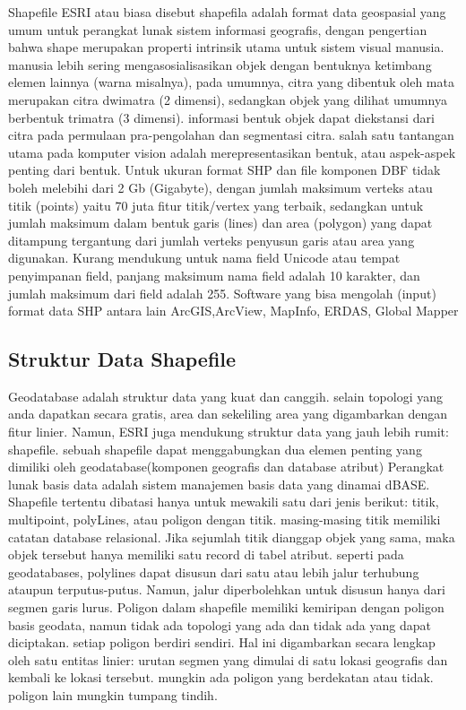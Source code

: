 Shapefile ESRI atau biasa disebut shapefila adalah format data geospasial yang umum untuk perangkat lunak sistem informasi geografis, dengan pengertian bahwa shape merupakan properti intrinsik utama untuk sistem visual manusia. manusia lebih sering mengasosialisasikan objek dengan bentuknya ketimbang elemen lainnya (warna misalnya), pada umumnya, citra yang dibentuk oleh mata merupakan citra dwimatra (2 dimensi), sedangkan objek yang dilihat umumnya berbentuk trimatra (3 dimensi). informasi bentuk objek dapat diekstansi dari citra pada permulaan pra-pengolahan dan segmentasi citra. salah satu tantangan utama pada komputer vision adalah merepresentasikan bentuk, atau aspek-aspek penting dari bentuk.
Untuk ukuran format SHP dan file komponen DBF tidak boleh melebihi dari 2 Gb (Gigabyte), 
dengan jumlah maksimum verteks atau titik (points) yaitu 70 juta fitur titik/vertex yang terbaik, 
sedangkan untuk jumlah maksimum dalam bentuk garis (lines) dan area (polygon) yang dapat ditampung tergantung dari jumlah verteks penyusun garis atau area yang digunakan. 
Kurang mendukung untuk nama field Unicode atau tempat penyimpanan field, panjang maksimum nama field adalah 10 karakter, 
dan jumlah maksimum dari field adalah 255.
Software yang bisa mengolah (input) format data SHP antara lain ArcGIS,ArcView, MapInfo, ERDAS, Global Mapper

\subsection{Struktur Data Shapefile}
Geodatabase adalah struktur data yang kuat dan canggih. selain topologi yang anda dapatkan secara gratis, area dan sekeliling area yang
digambarkan dengan fitur linier. Namun, ESRI juga mendukung struktur data yang jauh lebih rumit: shapefile. sebuah shapefile dapat menggabungkan dua elemen penting yang dimiliki oleh geodatabase(komponen geografis dan database atribut) Perangkat lunak 
basis data adalah sistem manajemen basis data yang dinamai dBASE. Shapefile tertentu dibatasi hanya untuk mewakili satu dari jenis berikut: titik, multipoint, polyLines, atau poligon dengan titik. masing-masing titik memiliki catatan database relasional. Jika sejumlah titik dianggap objek yang sama, maka objek tersebut hanya memiliki satu record di tabel atribut. seperti pada geodatabases, polylines dapat disusun dari satu atau lebih jalur terhubung ataupun terputus-putus. Namun, jalur diperbolehkan untuk disusun hanya dari segmen garis lurus. Poligon dalam shapefile memiliki kemiripan dengan poligon basis geodata, namun tidak ada topologi yang ada dan tidak ada yang dapat diciptakan. setiap poligon berdiri sendiri. Hal ini digambarkan secara lengkap oleh satu entitas linier: urutan segmen yang dimulai di satu lokasi geografis dan kembali ke lokasi tersebut. mungkin ada poligon yang berdekatan atau tidak. poligon lain mungkin tumpang tindih.

